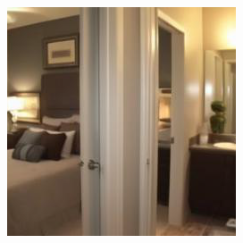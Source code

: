 \begin{figure}[H]
\begin{minipage}[b]{0.3\linewidth}
  \end{minipage}
\hspace{0.1cm}
  \begin{minipage}[b]{0.3\linewidth}
    \includegraphics[width=\linewidth]{Picture/progress/random/x_0000.png}
  \end{minipage}
\end{figure}